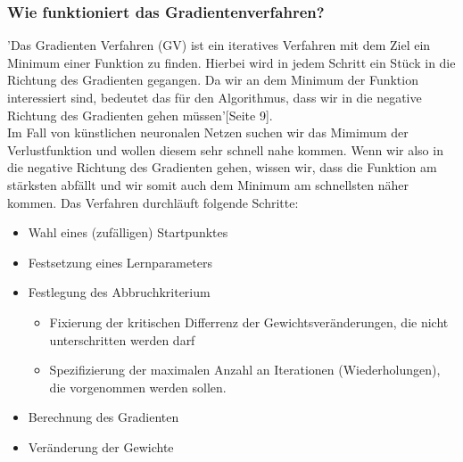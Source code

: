 \subsubsection{Wie funktioniert das Gradientenverfahren?}\label{subsec:gradientenverfahren:wie_funktioniert}
'Das Gradienten Verfahren (GV) ist ein iteratives Verfahren mit dem Ziel ein Minimum einer Funktion zu finden. Hierbei wird in jedem Schritt ein Stück in die Richtung des Gradienten
gegangen. Da wir an dem Minimum der Funktion interessiert sind, bedeutet das für den Algorithmus, dass wir in die negative Richtung des Gradienten gehen müssen'\cite{LH21}[Seite 9].
\\
Im Fall von künstlichen neuronalen Netzen suchen wir das Mimimum der Verlustfunktion und wollen diesem sehr schnell nahe kommen.
Wenn wir also in die negative Richtung des Gradienten gehen, wissen wir, dass die Funktion am stärksten abfällt und wir somit auch dem Minimum am schnellsten näher kommen. Das Verfahren durchläuft folgende Schritte:
  \begin{itemize}
    \item Wahl eines (zufälligen) Startpunktes
  \end{itemize}
  \begin{itemize}
    \item Festsetzung eines Lernparameters
  \end{itemize}
  \begin{itemize}
    \item Festlegung des Abbruchkriterium
    \begin{itemize}
    \item Fixierung der kritischen Differrenz der Gewichtsveränderungen, die nicht unterschritten werden darf
    \item Spezifizierung der maximalen Anzahl an Iterationen (Wiederholungen), die vorgenommen werden sollen.
    \end{itemize}
  \end{itemize}
  \begin{itemize}
    \item  Berechnung des Gradienten
  \end{itemize}
  \begin{itemize}
    \item Veränderung der Gewichte
  \end{itemize}

